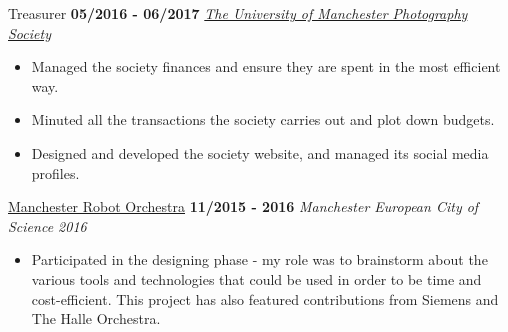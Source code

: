 \documentclass[]{friggeri-cv}
\begin{document}
\begin{entrylist}
\begin{itemize}
    \end{itemize}
  \entry
    {}
    {Treasurer}
    {\textbf{05/2016 - 06/2017}}
    {\emph{\href{https://www.facebook.com/UoMPhotoSoc/}{The University of Manchester Photography Society}}}
    \begin{itemize}
        \item Managed the society finances and ensure they are spent in the most efficient way.
        \item Minuted all the transactions the society carries out and plot down budgets.
        \item Designed and developed the society website, and managed its social media profiles. \\
    \end{itemize}
  \entry
    {}
    {\href{http://manchestersciencecity.com/inspire/article/the-robots-are-coming/}{Manchester Robot Orchestra}}
    {\textbf{11/2015 - 2016}}
    {\emph{Manchester European City of Science 2016}}
    \begin{itemize}
        \item Participated in the designing phase - my role was to brainstorm about the various tools and technologies that could be used in order to be time and cost-efficient. This project has also featured contributions from Siemens and The Halle Orchestra.
    \end{itemize}
\end{entrylist}
\clearpage
\end{document}
